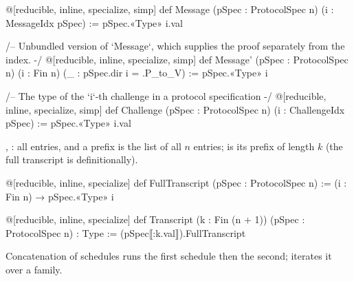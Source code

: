 

\begin{leancode}
@[reducible, inline, specialize, simp]
def Message (pSpec : ProtocolSpec n) (i : MessageIdx pSpec) := pSpec.«Type» i.val

/-- Unbundled version of `Message`, which supplies the proof separately from the index. -/
@[reducible, inline, specialize, simp]
def Message' (pSpec : ProtocolSpec n) (i : Fin n) (_ : pSpec.dir i = .P_to_V) := pSpec.«Type» i

/-- The type of the `i`-th challenge in a protocol specification -/
@[reducible, inline, specialize, simp]
def Challenge (pSpec : ProtocolSpec n) (i : ChallengeIdx pSpec) := pSpec.«Type» i.val
\end{leancode}


\begin{define}{, : all entries, and a prefix}
 is the list of all $n$ entries;  is its prefix of length
$k$ (the full transcript is  definitionally).
\end{define}

\begin{leancode}
@[reducible, inline, specialize]
def FullTranscript (pSpec : ProtocolSpec n) := (i : Fin n) → pSpec.«Type» i
\end{leancode}



\begin{leancode}
@[reducible, inline, specialize]
def Transcript (k : Fin (n + 1)) (pSpec : ProtocolSpec n) : Type :=
  (pSpec⟦:k.val⟧).FullTranscript
\end{leancode}


\begin{define}{Concatenation of schedules}
 runs the first schedule then the second;  iterates it
over a family.
\end{define}

